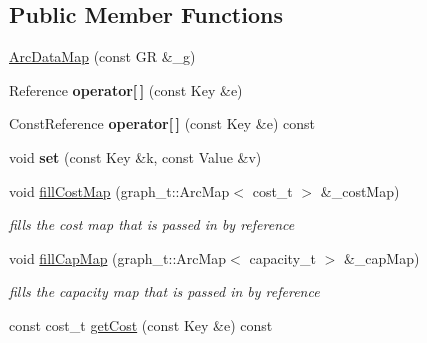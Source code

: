 \subsection*{Public Member Functions}
\begin{DoxyCompactItemize}
\item 
\hyperlink{classnetxpert_1_1data_1_1ArcDataMap_a6dd73f6c194b7b4f41a2d3457e90ccb3}{Arc\+Data\+Map} (const GR \&\+\_\+g)
\item 
Reference {\bfseries operator\mbox{[}$\,$\mbox{]}} (const Key \&e)\hypertarget{classnetxpert_1_1data_1_1ArcDataMap_ab19b12bb1dbcc25a57c6b12d7f4bf1f1}{}\label{classnetxpert_1_1data_1_1ArcDataMap_ab19b12bb1dbcc25a57c6b12d7f4bf1f1}

\item 
Const\+Reference {\bfseries operator\mbox{[}$\,$\mbox{]}} (const Key \&e) const \hypertarget{classnetxpert_1_1data_1_1ArcDataMap_a75fd10dc00b5dab7b2545f18af2b18e8}{}\label{classnetxpert_1_1data_1_1ArcDataMap_a75fd10dc00b5dab7b2545f18af2b18e8}

\item 
void {\bfseries set} (const Key \&k, const Value \&v)\hypertarget{classnetxpert_1_1data_1_1ArcDataMap_abed56a049ad56a8fefa45631407cb5f7}{}\label{classnetxpert_1_1data_1_1ArcDataMap_abed56a049ad56a8fefa45631407cb5f7}

\item 
void \hyperlink{classnetxpert_1_1data_1_1ArcDataMap_a2e1260a6420e1d3d12e37a2d419dc51a}{fill\+Cost\+Map} (graph\+\_\+t\+::\+Arc\+Map$<$ cost\+\_\+t $>$ \&\+\_\+cost\+Map)\hypertarget{classnetxpert_1_1data_1_1ArcDataMap_a2e1260a6420e1d3d12e37a2d419dc51a}{}\label{classnetxpert_1_1data_1_1ArcDataMap_a2e1260a6420e1d3d12e37a2d419dc51a}

\begin{DoxyCompactList}\small\item\em fills the cost map that is passed in by reference \end{DoxyCompactList}\item 
void \hyperlink{classnetxpert_1_1data_1_1ArcDataMap_a2b7867df35bee63d8e422a0009ed7a98}{fill\+Cap\+Map} (graph\+\_\+t\+::\+Arc\+Map$<$ capacity\+\_\+t $>$ \&\+\_\+cap\+Map)\hypertarget{classnetxpert_1_1data_1_1ArcDataMap_a2b7867df35bee63d8e422a0009ed7a98}{}\label{classnetxpert_1_1data_1_1ArcDataMap_a2b7867df35bee63d8e422a0009ed7a98}

\begin{DoxyCompactList}\small\item\em fills the capacity map that is passed in by reference \end{DoxyCompactList}\item 
const cost\+\_\+t \hyperlink{classnetxpert_1_1data_1_1ArcDataMap_ab38aa26b69f85d1c03afd8f8ec996328}{get\+Cost} (const Key \&e) const \hypertarget{classnetxpert_1_1data_1_1ArcDataMap_ab38aa26b69f85d1c03afd8f8ec996328}{}\label{classnetxpert_1_1data_1_1ArcDataMap_ab38aa26b69f85d1c03afd8f8ec996328}


\end{DoxyCompactItemize}
